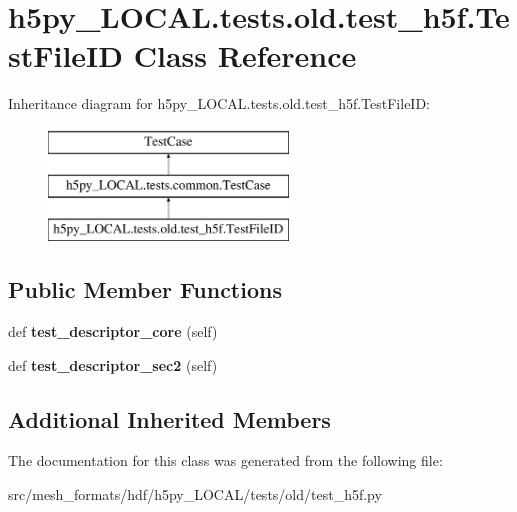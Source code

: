 \hypertarget{classh5py__LOCAL_1_1tests_1_1old_1_1test__h5f_1_1TestFileID}{}\section{h5py\+\_\+\+L\+O\+C\+A\+L.\+tests.\+old.\+test\+\_\+h5f.\+Test\+File\+ID Class Reference}
\label{classh5py__LOCAL_1_1tests_1_1old_1_1test__h5f_1_1TestFileID}
Inheritance diagram for h5py\+\_\+\+L\+O\+C\+A\+L.\+tests.\+old.\+test\+\_\+h5f.\+Test\+File\+ID\+:\begin{figure}[H]
\begin{center}
\leavevmode
\includegraphics[height=3.000000cm]{classh5py__LOCAL_1_1tests_1_1old_1_1test__h5f_1_1TestFileID}
\end{center}
\end{figure}
\subsection*{Public Member Functions}
\begin{DoxyCompactItemize}
\item 
\mbox{\label{classh5py__LOCAL_1_1tests_1_1old_1_1test__h5f_1_1TestFileID_a0470e895c23dadca8719536188473e74}} 
def {\bfseries test\+\_\+descriptor\+\_\+core} (self)
\item 
\mbox{\label{classh5py__LOCAL_1_1tests_1_1old_1_1test__h5f_1_1TestFileID_a12c1f0c04256edfb0307f9c2f5b22e74}} 
def {\bfseries test\+\_\+descriptor\+\_\+sec2} (self)
\end{DoxyCompactItemize}
\subsection*{Additional Inherited Members}


The documentation for this class was generated from the following file\+:\begin{DoxyCompactItemize}
\item 
src/mesh\+\_\+formats/hdf/h5py\+\_\+\+L\+O\+C\+A\+L/tests/old/test\+\_\+h5f.\+py\end{DoxyCompactItemize}
